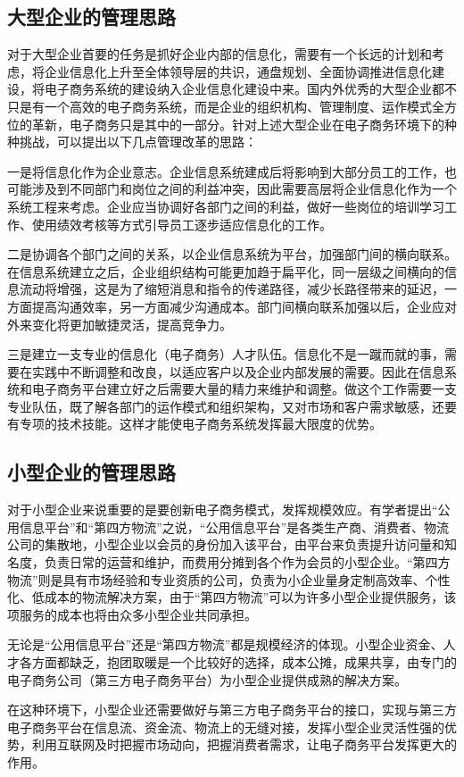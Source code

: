 \documentclass[UTF8]{ctexart}
\begin{document}
\subsection{大型企业的管理思路}
对于大型企业首要的任务是抓好企业内部的信息化，需要有一个长远的计划和考虑，将企业信息化上升至全体领导层的共识，通盘规划、全面协调推进信息化建设，将电子商务系统的建设纳入企业信息化建设中来。国内外优秀的大型企业都不只是有一个高效的电子商务系统，而是企业的组织机构、管理制度、运作模式全方位的革新，电子商务只是其中的一部分。针对上述大型企业在电子商务环境下的种种挑战，可以提出以下几点管理改革的思路：\par
一是将信息化作为企业意志。企业信息系统建成后将影响到大部分员工的工作，也可能涉及到不同部门和岗位之间的利益冲突，因此需要高层将企业信息化作为一个系统工程来考虑。企业应当协调好各部门之间的利益，做好一些岗位的培训学习工作、使用绩效考核等方式引导员工逐步适应信息化的工作。\par
二是协调各个部门之间的关系，以企业信息系统为平台，加强部门间的横向联系。在信息系统建立之后，企业组织结构可能更加趋于扁平化，同一层级之间横向的信息流动将增强，这是为了缩短消息和指令的传递路径，减少长路径带来的延迟，一方面提高沟通效率，另一方面减少沟通成本。部门间横向联系加强以后，企业应对外来变化将更加敏捷灵活，提高竞争力。\par
三是建立一支专业的信息化（电子商务）人才队伍。信息化不是一蹴而就的事，需要在实践中不断调整和改良，以适应客户以及企业内部发展的需要。因此在信息系统和电子商务平台建立好之后需要大量的精力来维护和调整。做这个工作需要一支专业队伍，既了解各部门的运作模式和组织架构，又对市场和客户需求敏感，还要有专项的技术技能。这样才能使电子商务系统发挥最大限度的优势。
\subsection{小型企业的管理思路}
对于小型企业来说重要的是要创新电子商务模式，发挥规模效应。有学者提出“公用信息平台”\cite{Yue}和“第四方物流”\cite{Wiki}之说，“公用信息平台”是各类生产商、消费者、物流公司的集散地，小型企业以会员的身份加入该平台，由平台来负责提升访问量和知名度，负责日常的运营和维护，而费用分摊到各个作为会员的小型企业。“第四方物流”则是具有市场经验和专业资质的公司，负责为小企业量身定制高效率、个性化、低成本的物流解决方案，由于“第四方物流”可以为许多小型企业提供服务，该项服务的成本也将由众多小型企业共同承担。\par
无论是“公用信息平台”还是“第四方物流”都是规模经济的体现。小型企业资金、人才各方面都缺乏，抱团取暖是一个比较好的选择，成本公摊，成果共享，由专门的电子商务公司（第三方电子商务平台）为小型企业提供成熟的解决方案。\par
在这种环境下，小型企业还需要做好与第三方电子商务平台的接口，实现与第三方电子商务平台在信息流、资金流、物流上的无缝对接，发挥小型企业灵活性强的优势，利用互联网及时把握市场动向，把握消费者需求，让电子商务平台发挥更大的作用。
\end{document}
